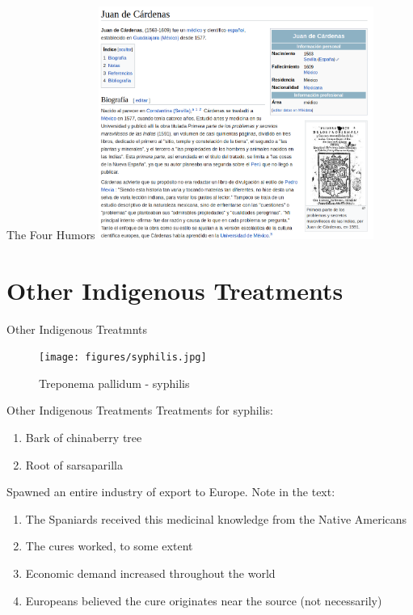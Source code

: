 \documentclass{beamer}
\begin{document}
\begin{frame}{The Four Humors}
\includegraphics[width=9cm]{figures/cardenas.png}
\end{frame}

\section{Other Indigenous Treatments}

\begin{frame}{Other Indigenous Treatmnts}
\begin{figure}
\centering
\texttt{[image: figures/syphilis.jpg]}
\caption{Treponema pallidum - syphilis}
\end{figure}
\end{frame}

\begin{frame}{Other Indigenous Treatments}
Treatments for syphilis:
\begin{enumerate}
\item Bark of chinaberry tree
\item Root of sarsaparilla
\end{enumerate}
Spawned an entire industry of export to Europe.  Note in the text:
\begin{enumerate}
\item The Spaniards received this medicinal knowledge from the Native Americans
\item The cures worked, to some extent
\item Economic demand increased throughout the world
\item Europeans believed the cure originates near the source (not necessarily)
\end{enumerate}
\end{frame}
\end{document}
